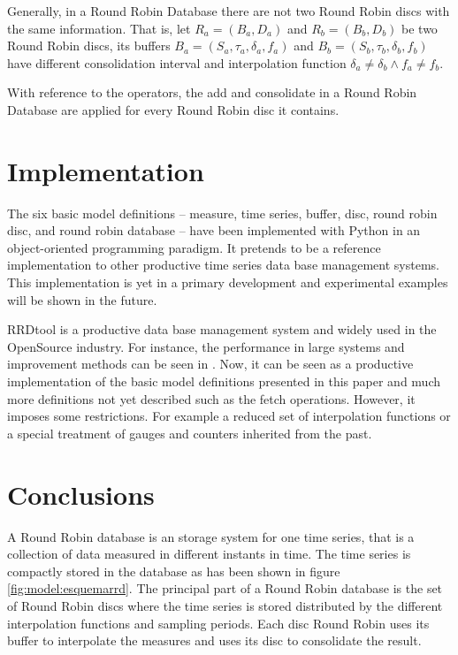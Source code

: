 Generally, in a Round Robin Database there are not two Round Robin discs
with the same information. That is, let $R_a = (B_a, D_a)$ and $R_b =
(B_b, D_b)$ be two Round Robin discs, its buffers
$B_a=(S_a,\tau_a,\delta_a,f_a)$ and $B_b=(S_b,\tau_b,\delta_b,f_b)$
have different consolidation interval and interpolation function
$\delta_a \neq \delta_b \wedge f_a \neq f_b$.


With reference to the operators, the add and consolidate in a Round
Robin Database are applied for every Round Robin disc it contains.


\section{Implementation}

The six basic model definitions -- measure, time series, buffer, disc,
round robin disc, and round robin database -- have been implemented
with Python in an object-oriented programming paradigm. It pretends to
be a reference implementation to other productive time series data
base management systems. This implementation is yet in a primary
development and experimental examples will be shown in the future.

RRDtool \parencite{rrdtool} is a productive data base
management system and widely used in the OpenSource industry. For
instance, the performance in large systems and improvement methods can
be seen in \cite{lisa07:plonka}. Now, it can be seen as a
productive implementation of the basic model definitions presented in
this paper and much more definitions not yet described such as the
fetch operations. However, it imposes some restrictions. For example a
reduced set of interpolation functions or a special treatment of
gauges and counters inherited from the past.


\section{Conclusions}

A Round Robin database is an storage system for one time series, that
is a collection of data measured in different instants in time.  The
time series is compactly stored in the database as has been shown in
figure \ref{fig:model:esquemarrd}. The principal part of a Round Robin
database is the set of Round Robin discs where the time series is
stored distributed by the different interpolation functions and
sampling periods. Each disc Round Robin uses its buffer to interpolate
the measures and uses its disc to consolidate the result. 

